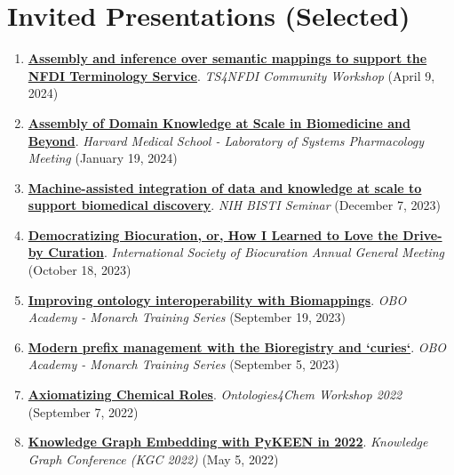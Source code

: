 \documentclass[10pt,a4paper,sans]{moderncv} %
\begin{document}
\section{Invited Presentations (Selected)}
\begin{enumerate}
\itemsep0.5em
    \item \textbf{\href{https://bit.ly/semra4nfdi}{Assembly and inference over semantic mappings to support the NFDI Terminology Service}}. \textit{TS4NFDI Community Workshop} (April 9, 2024)

    \item \textbf{\href{https://bit.ly/cth-lsp-2024}{Assembly of Domain Knowledge at Scale in Biomedicine and Beyond}}. \textit{Harvard Medical School - Laboratory of Systems Pharmacology Meeting} (January 19, 2024)

    \item \textbf{\href{https://www.dropbox.com/scl/fi/phd98s1oql2knjp2v9lhq/2023-12-07_hoyt_gyori_nih_bisti.pdf?rlkey=qlorv5a1d79ofhhkatjpmj3tb&dl=0}{Machine-assisted integration of data and knowledge at scale to support biomedical discovery}}. \textit{NIH BISTI Seminar} (December 7, 2023)

    \item \textbf{\href{https://docs.google.com/presentation/d/1D6P-1hQefXU_yRODSJkOFLH3tPxsk9Abi20ycA0xKWU/edit?usp=sharing}{Democratizing Biocuration, or, How I Learned to Love the Drive-by Curation}}. \textit{International Society of Biocuration Annual General Meeting} (October 18, 2023)

    \item \textbf{\href{https://bit.ly/obo-academy-biomappings}{Improving ontology interoperability with Biomappings}}. \textit{OBO Academy - Monarch Training Series} (September 19, 2023)

    \item \textbf{\href{https://docs.google.com/presentation/d/1Hyi9t_wwoMAFskWtDBMHGpAw7ZwTQx-3RKrFdTFYB88/edit?usp=sharing}{Modern prefix management with the Bioregistry and `curies`}}. \textit{OBO Academy - Monarch Training Series} (September 5, 2023)

    \item \textbf{\href{https://bit.ly/ontologies4chem-crog}{Axiomatizing Chemical Roles}}. \textit{Ontologies4Chem Workshop 2022} (September 7, 2022)

    \item \textbf{\href{https://bit.ly/pykeen-kgc2022}{Knowledge Graph Embedding with PyKEEN in 2022}}. \textit{Knowledge Graph Conference (KGC 2022)} (May 5, 2022)


\end{enumerate}
\end{document}
